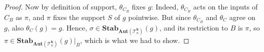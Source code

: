 \documentclass[11pt]{article}
\newcommand{\Aut}{\mathbf{Aut}}
\newcommand{\Stab}{\mathbf{Stab}}
\newcommand{\Tt}{{\mathcal T}}
\theoremstyle{definition}
\theoremstyle{plain}
\theoremstyle{remark}
\theoremstyle{remark}
\begin{document}
\begin{proof}
	Now by definition of support, $\theta_{C_B}$ fixes $g$: Indeed, $\theta_{C_B}$ acts on the inputs of $C_B$ as $\pi$, and $\pi$ fixes the support $S$ of $g$ pointwise. But since $\theta_{C_B}$ and $\theta_C$ agree on $g$, also $\theta_C(g) = g$. Hence, $\sigma \in \Stab_{\Aut(\Tt_n^{\boldsymbol{k}})}(g)$, and its restriction to $B$ is $\pi$, so $\pi \in \Stab_{\Aut(\Tt_n^{\boldsymbol{k}})}(g)|_B$, which is what we had to show.
\end{proof}	











\end{document}
